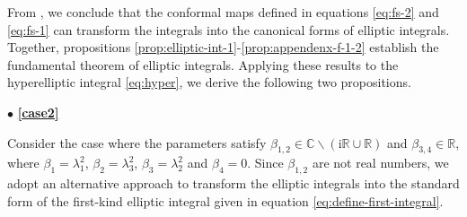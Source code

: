 \documentclass[11pt,reqno]{amsart}
\newcommand{\ii}{\mathrm{i}}
\newcommand{\dd}{\mathrm{d}}
\numberwithin{equation}{section}
\begin{document}
From , we conclude that the conformal maps defined in equations \eqref{eq:fs-2} and \eqref{eq:fs-1} can transform the integrals into the canonical forms of elliptic integrals.
Together, propositions \ref{prop:elliptic-int-1}-\ref{prop:appendenx-f-1-2} establish the fundamental theorem of elliptic integrals. 
Applying these results to the hyperelliptic integral \eqref{eq:hyper}, we derive the following two propositions.




\vspace{0.1cm}
\noindent $\bullet$\quad
\textbf{\large \ref{case2}}

Consider the case where the parameters satisfy $\beta_{1,2}\in \mathbb{C}\backslash(\ii \mathbb{R}\cup \mathbb{R})$ and $\beta_{3,4}\in \mathbb{R}$, where $\beta_1=\lambda_1^2$, $\beta_2=\lambda_3^2$, $\beta_3=\lambda_2^2$ and $\beta_4=0$.
Since $\beta_{1,2}$ are not real numbers, we adopt an alternative approach to transform the elliptic integrals into the standard form of the first-kind elliptic integral given in equation \eqref{eq:define-first-integral}.
 
\end{document}
